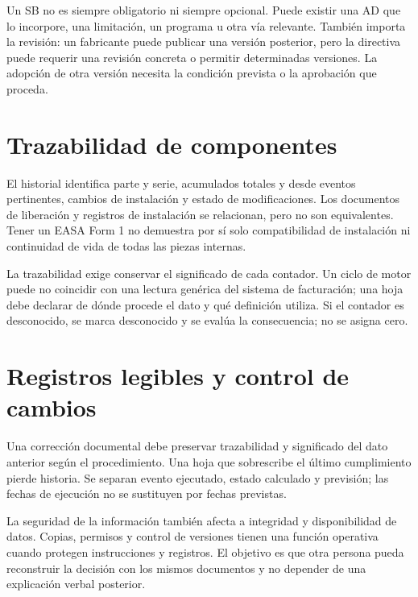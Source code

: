 Un SB no es siempre obligatorio ni siempre opcional. Puede existir una AD que lo incorpore, una limitación, un programa u otra vía relevante. También importa la revisión: un fabricante puede publicar una versión posterior, pero la directiva puede requerir una revisión concreta o permitir determinadas versiones. La adopción de otra versión necesita la condición prevista o la aprobación que proceda.
\section{Trazabilidad de componentes}
El historial identifica parte y serie, acumulados totales y desde eventos pertinentes, cambios de instalación y estado de modificaciones. Los documentos de liberación y registros de instalación se relacionan, pero no son equivalentes. Tener un EASA Form 1 no demuestra por sí solo compatibilidad de instalación ni continuidad de vida de todas las piezas internas.

La trazabilidad exige conservar el significado de cada contador. Un ciclo de motor puede no coincidir con una lectura genérica del sistema de facturación; una hoja debe declarar de dónde procede el dato y qué definición utiliza. Si el contador es desconocido, se marca desconocido y se evalúa la consecuencia; no se asigna cero.
\section{Registros legibles y control de cambios}
Una corrección documental debe preservar trazabilidad y significado del dato anterior según el procedimiento. Una hoja que sobrescribe el último cumplimiento pierde historia. Se separan evento ejecutado, estado calculado y previsión; las fechas de ejecución no se sustituyen por fechas previstas.

La seguridad de la información también afecta a integridad y disponibilidad de datos. Copias, permisos y control de versiones tienen una función operativa cuando protegen instrucciones y registros. El objetivo es que otra persona pueda reconstruir la decisión con los mismos documentos y no depender de una explicación verbal posterior.
